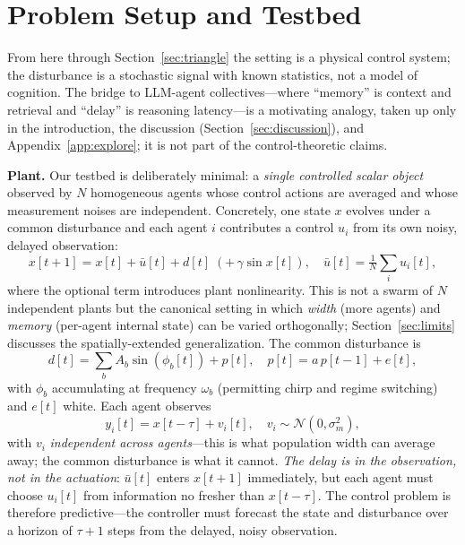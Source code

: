 \documentclass[journal]{IEEEtran}
\begin{document}
\section{Problem Setup and Testbed}
\label{sec:setup}
From here through Section~\ref{sec:triangle} the setting is a physical control
system; the disturbance is a stochastic signal with known statistics, not a
model of cognition. The bridge to LLM-agent collectives---where ``memory'' is
context and retrieval and ``delay'' is reasoning latency---is a motivating
analogy, taken up only in the introduction, the discussion
(Section~\ref{sec:discussion}), and Appendix~\ref{app:explore}; it is not part
of the control-theoretic claims.

\textbf{Plant.} Our testbed is deliberately minimal: a \emph{single controlled
scalar object} observed by $N$ homogeneous agents whose control actions are
averaged and whose measurement noises are independent. Concretely, one state
$x$ evolves under a common disturbance and each agent $i$ contributes a control
$u_i$ from its own noisy, delayed observation:
\begin{equation}
x[t+1] = x[t] + \bar{u}[t] + d[t] \;(+\,\gamma \sin x[t]),\quad
\bar{u}[t] = \tfrac1N\!\sum_i u_i[t],
\end{equation}
where the optional term introduces plant nonlinearity. This is not a swarm of
$N$ independent plants but the canonical setting in which \emph{width} (more
agents) and \emph{memory} (per-agent internal state) can be varied
orthogonally; Section~\ref{sec:limits} discusses the spatially-extended
generalization. The common disturbance is
\begin{equation}
d[t] = \sum_b A_b \sin(\phi_b[t]) + p[t], \quad p[t] = a\,p[t-1] + e[t],
\end{equation}
with $\phi_b$ accumulating at frequency $\omega_b$ (permitting chirp and regime
switching) and $e[t]$ white. Each agent observes
\begin{equation}
y_i[t] = x[t-\tau] + v_i[t], \quad v_i \sim \mathcal{N}(0,\sigma_m^2),
\end{equation}
with $v_i$ \emph{independent across agents}---this is what population width can
average away; the common disturbance is what it cannot. \emph{The delay is in
the observation, not in the actuation}: $\bar{u}[t]$ enters $x[t+1]$
immediately, but each agent must choose $u_i[t]$ from information no fresher
than $x[t-\tau]$. The control problem is therefore predictive---the controller
must forecast the state and disturbance over a horizon of $\tau+1$ steps from
the delayed, noisy observation.
\end{document}
